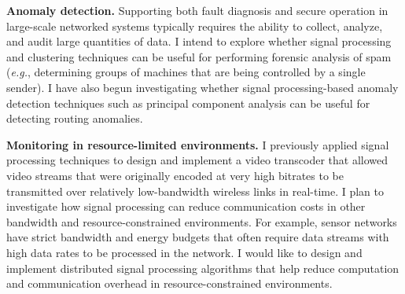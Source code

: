 \documentclass[11pt]{article}
\newcommand{\eg}{{\em e.g.}}
\begin{document}
{\bf Anomaly detection.}  Supporting both fault diagnosis and secure
operation in large-scale networked systems typically requires the
ability to collect, analyze, and audit large quantities of data.  I
intend to explore whether signal processing and clustering techniques
can be useful for performing forensic analysis of spam (\eg, determining
groups of machines that are being controlled by a single sender).  I
have also begun investigating whether signal processing-based anomaly
detection techniques such as principal component analysis can be useful
for detecting routing anomalies.


{\bf Monitoring in resource-limited environments.}  
I previously applied signal processing techniques to design and
implement a video transcoder that allowed video streams that were
originally encoded at very high bitrates to be transmitted over
relatively low-bandwidth wireless links in real-time.  I plan to
investigate how signal processing can reduce communication costs in other
bandwidth and resource-constrained environments.  For example, sensor
networks have strict bandwidth and energy budgets that often require
data streams with high data rates to be processed in the network.  I 
would like to design and implement distributed signal processing
algorithms that help reduce computation and communication overhead in
resource-constrained environments.

\end{document}
